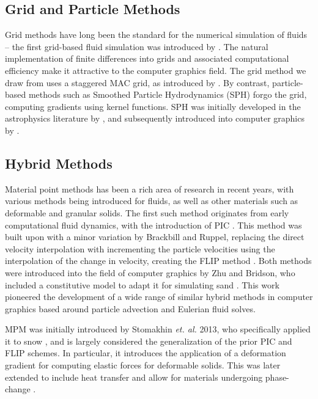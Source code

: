 \documentclass[sigconf]{acmart}
\begin{document}
\subsection{Grid and Particle Methods}

Grid methods have long been the standard for the numerical simulation of fluids -- the first grid-based fluid simulation was introduced by \cite{foster1996}. The natural implementation of finite differences into grids and associated computational efficiency make it attractive to the computer graphics field. The grid method we draw from uses a staggered MAC grid, as introduced by \cite{harlow1965}. By contrast, particle-based methods such as Smoothed Particle Hydrodynamics (SPH) forgo the grid, computing gradients using kernel functions. SPH was initially developed in the astrophysics literature by \cite{lucy1977, gingold1977}, and subsequently introduced into computer graphics by \cite{muller2003}.

\subsection{Hybrid Methods}

Material point methods has been a rich area of research in recent years, with various methods being introduced for fluids, as well as other materials such as deformable and granular solids. The first such method originates from early computational fluid dynamics, with the introduction of PIC \cite{harlow1962}. This method was built upon with a minor variation by Brackbill and Ruppel, replacing the direct velocity interpolation with incrementing the particle velocities using the interpolation of the change in velocity, creating the FLIP method \cite{brackbill1986}. Both methods were introduced into the field of computer graphics by Zhu and Bridson, who included a constitutive model to adapt it for simulating sand \cite{zhu2005}. This work pioneered the development of a wide range of similar hybrid methods in computer graphics based around particle advection and Eulerian fluid solves.

MPM was initially introduced by Stomakhin \emph{et. al.} 2013, who specifically applied it to snow \cite{stomakhin2013}, and is largely considered the generalization of the prior PIC and FLIP schemes. In particular, it introduces the application of a deformation gradient for computing elastic forces for deformable solids. This was later extended to include heat transfer and allow for materials undergoing phase-change \cite{stomakhin2014}.
\end{document}
